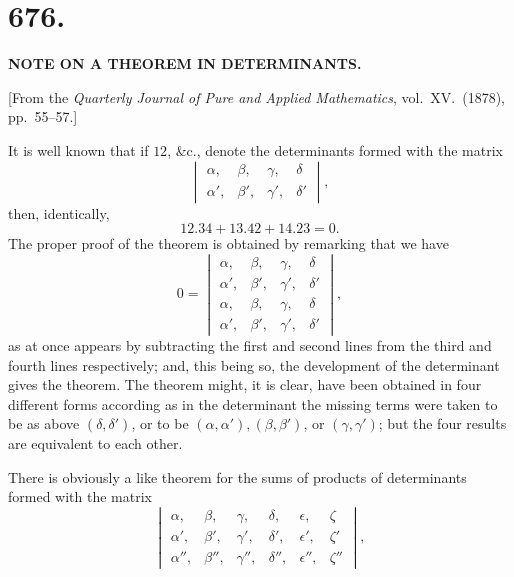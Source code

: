 \documentclass[11pt,a4paper]{article}
\begin{document}
\newpage



\section*{676.}

\begin{center}
\textbf{NOTE ON A THEOREM IN DETERMINANTS.}
\end{center}

\medskip

\begin{center}
[From the \emph{Quarterly Journal of Pure and Applied Mathematics}, vol.~XV.\ (1878), pp.~55--57.]
\end{center}

\medskip

\noindent It is well known that if $12$, \&c., denote the determinants formed with the matrix
\[
\begin{vmatrix}
\alpha, & \beta, & \gamma, & \delta\\
\alpha', & \beta', & \gamma', & \delta'
\end{vmatrix},
\]
then, identically,
\[
12.34 + 13.42 + 14.23 = 0.
\]
The proper proof of the theorem is obtained by remarking that we have
\[
0 = \begin{vmatrix}
\alpha, & \beta, & \gamma, & \delta\\
\alpha', & \beta', & \gamma', & \delta'\\
\alpha, & \beta, & \gamma, & \delta\\
\alpha', & \beta', & \gamma', & \delta'
\end{vmatrix},
\]
as at once appears by subtracting the first and second lines from the third and fourth lines respectively; and, this being so, the development of the determinant gives the theorem. The theorem might, it is clear, have been obtained in four different forms according as in the determinant the missing terms were taken to be as above $(\delta, \delta')$, or to be $(\alpha, \alpha'), (\beta, \beta')$, or $(\gamma, \gamma')$; but the four results are equivalent to each other.

\medskip

There is obviously a like theorem for the sums of products of determinants formed with the matrix
\[
\begin{vmatrix}
\alpha, & \beta, & \gamma, & \delta, & \epsilon, & \zeta\\
\alpha', & \beta', & \gamma', & \delta', & \epsilon', & \zeta'\\
\alpha'', & \beta'', & \gamma'', & \delta'', & \epsilon'', & \zeta''
\end{vmatrix},
\]
\end{document}
